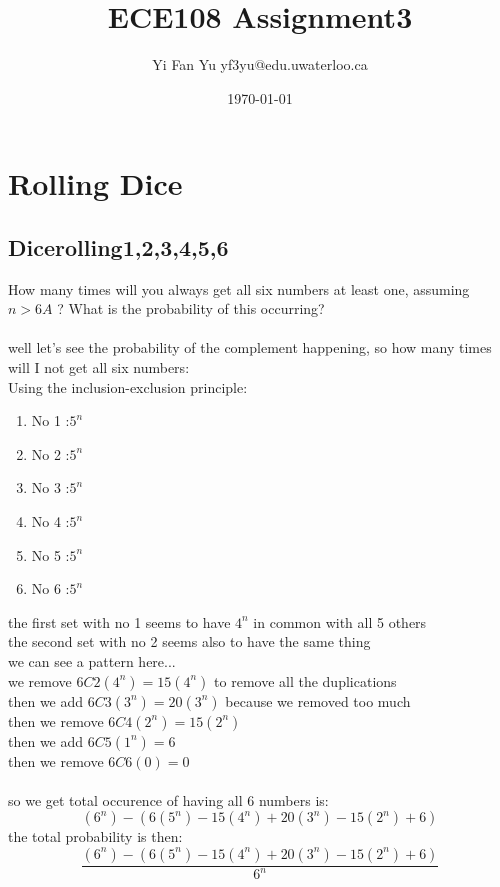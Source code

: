 \documentclass[a4paper,12pt]{article}
\begin{document}
\title{ECE108 Assignment3} \author{Yi Fan Yu yf3yu@edu.uwaterloo.ca} \date{\today}

\maketitle

\tableofcontents
\newpage
\renewcommand\thesubsection{\alph{subsection}}
\section{Rolling Dice}
\subsection{Dicerolling1,2,3,4,5,6}
How many times will you always get all six numbers at least one, assuming $n > 6A$ ?
What is the probability of this occurring?\\
\bigskip\\
well let's see the probability of the complement happening, so how many times will I not get all six numbers:\\
Using the inclusion-exclusion principle:\\
  \begin{enumerate}
    \item No 1 :$5^n$
    \item No 2 :$5^n$
    \item No 3 :$5^n$
    \item No 4 :$5^n$
    \item No 5 :$5^n$
    \item No 6 :$5^n$
  \end{enumerate}
  the first set with no 1 seems to have $4^n$ in common with all 5 others\\
  the second set with no 2 seems also to have the same thing\\
  we can see a pattern here... \\
  we remove $6C2(4^n) = 15(4^n)$ to remove all the duplications\\
  then we add $6C3(3^n) = 20 (3^n)$ because we removed too much\\
  then we remove $6C4(2^n) = 15 (2^n)$\\
  then we add $6C5(1^n) = 6$\\
  then we remove $6C6(0) =0$\\
  \bigskip\\
  so we get total occurence of having all 6 numbers is:\\
  \[(6^n) - (6(5^n) -15(4^n) + 20(3^n)- 15(2^n) + 6) \]
  the total probability is then:
  \[\frac{(6^n) - (6(5^n) -15(4^n) + 20(3^n)- 15(2^n) + 6)}{6^n} \]
\end{document}
